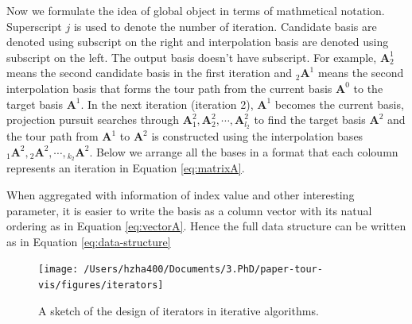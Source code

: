 \documentclass[12pt]{article}
\begin{document}
Now we formulate the idea of global object in terms of mathmetical
notation. Superscript \(j\) is used to denote the number of iteration.
Candidate basis are denoted using subscript on the right and
interpolation basis are denoted using subscript on the left. The output
basis doesn't have subscript. For example, \(\mathbf{A}^1_{2}\) means
the second candidate basis in the first iteration and
\({}_{2}\mathbf{A}^1\) means the second interpolation basis that forms
the tour path from the current basis \(\mathbf{A}^0\) to the target
basis \(\mathbf{A}^1\). In the next iteration (iteration 2),
\(\mathbf{A}^1\) becomes the current basis, projection pursuit searches
through
\(\mathbf{A}^2_{1}, \mathbf{A}^2_{2}, \cdots, \mathbf{A}^2_{l_2}\) to
find the target basis \(\mathbf{A}^2\) and the tour path from
\(\mathbf{A}^1\) to \(\mathbf{A}^2\) is constructed using the
interpolation bases
\({}_{1}\mathbf{A}^2, {}_{2}\mathbf{A}^2, \cdots, {}_{k_2}\mathbf{A}^2\).
Below we arrange all the bases in a format that each coloumn represents
an iteration in Equation \ref{eq:matrixA}.

When aggregated with information of index value and other interesting
parameter, it is easier to write the basis as a column vector with its
natual ordering as in Equation \ref{eq:vectorA}. Hence the full data
structure can be written as in Equation \ref{eq:data-structure}

\begin{figure}
\texttt{[image: /Users/hzha400/Documents/3.PhD/paper-tour-vis/figures/iterators]} \caption{\label{iterators} A sketch of the design of iterators in iterative algorithms.}\label{fig:iterators}
\end{figure}
\end{document}
